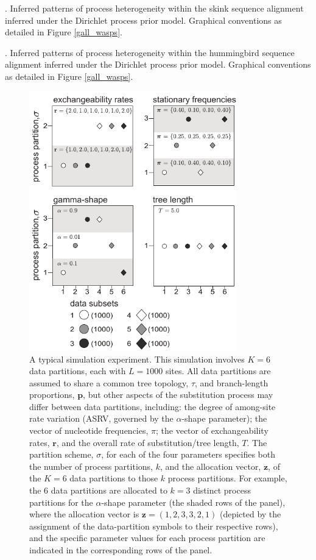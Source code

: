 \documentclass[11pt]{article}
\begin{document}
{\bigskip

. Inferred patterns of process heterogeneity within the skink sequence alignment inferred under the Dirichlet process prior model.  Graphical conventions as detailed in Figure \ref{gall_wasps}.

\bigskip

. Inferred patterns of process heterogeneity within the hummingbird sequence alignment inferred under the Dirichlet process prior model.  Graphical conventions as detailed in Figure \ref{gall_wasps}.

}

\newpage

\begin{figure}[h] 
\centering 
\includegraphics[width=90mm]{figures/figure_0.pdf} 
\caption{A typical simulation experiment.  This simulation involves $K = 6$ data partitions, each with $L = 1000$ sites. All data partitions are assumed to share a common tree topology, $\tau$, and branch-length proportions, ${\mathbf p}$, but other aspects of the substitution process may differ between data partitions, including: the degree of among-site rate variation (ASRV, governed by the $\alpha$-shape parameter); the vector of nucleotide frequencies, \mbox{\boldmath$\pi$\unboldmath}; the vector of exchangeability rates, ${\mathbf r}$, and the overall rate of substitution/tree length, $T$.  The partition scheme, $\sigma$, for each of the four parameters specifies both the number of process partitions, $k$, and the allocation vector, ${\mathbf z}$, of the $K = 6$ data partitions to those $k$ process partitions. For example, the 6 data partitions are allocated to $k = 3$ distinct process partitions for the $\alpha$-shape parameter (the shaded rows of the panel), where the allocation vector is ${\mathbf z}  = (1,2,3,3,2,1)$ (depicted by the assignment of the data-partition symbols to their respective rows), and the specific parameter values for each process partition are indicated in the corresponding rows of the panel.}
\label{sim_design}
\end{figure} 
\end{document}
